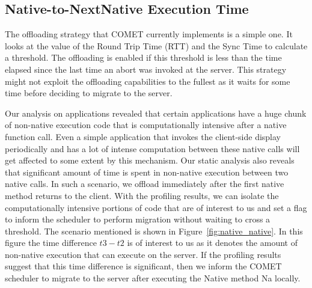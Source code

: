 \subsection{Native-to-NextNative Execution Time}
The offloading strategy that COMET currently implements is a simple one. It looks at the value of the Round Trip Time (RTT) and
the Sync Time to calculate a threshold. The offloading is enabled if this threshold is less than the time elapsed since the last
time an abort was invoked at the server. This strategy might not exploit the offloading capabilities to the fullest as it waits for
some time before deciding to migrate to the server.

Our analysis on applications revealed that certain applications have a huge chunk of non-native execution code that is computationally
intensive after a native function call. Even a simple application that invokes the client-side display periodically and has a lot of intense
computation between these native calls will get affected to some extent by this mechanism. Our static analysis also reveals that significant
amount of time is spent in non-native execution between two native calls. In such a scenario, we offload immediately after the first
native method returns to the client. With the profiling results, we can isolate the computationally intensive portions of code that
are of interest to us and set a flag to inform the scheduler to perform migration without waiting to cross a threshold. The scenario
mentioned is shown in Figure~\ref{fig:native_native}. In this figure the time difference $t3-t2$ is of interest to us as it denotes the amount
of non-native execution that can execute on the server. If the profiling results suggest that this time difference is significant, then we
inform the COMET scheduler to migrate to the server after executing the Native method Na locally.

